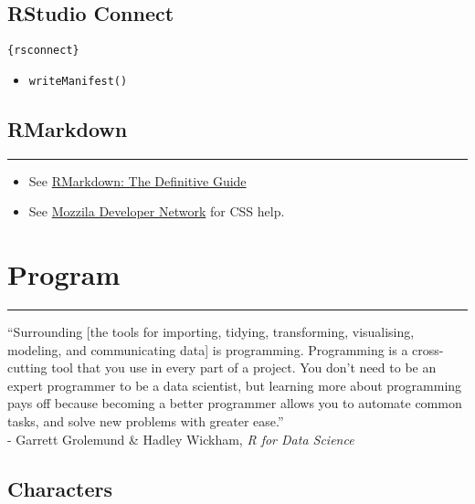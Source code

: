 \documentclass[
]{book}
\providecommand{\tightlist}{%
  \setlength{\itemsep}{0pt}\setlength{\parskip}{0pt}}
\begin{document}
\hypertarget{rstudio-connect}{%
\section{RStudio Connect}\label{rstudio-connect}}

\texttt{\{rsconnect\}}

\begin{itemize}
\tightlist
\item
  \texttt{writeManifest()}
\end{itemize}

\hypertarget{rmarkdown}{%
\section{RMarkdown}\label{rmarkdown}}

\begin{center}\rule{0.5\linewidth}{0.5pt}\end{center}

\begin{itemize}
\tightlist
\item
  See \href{https://bookdown.org/yihui/rmarkdown/}{RMarkdown: The Definitive Guide}
\item
  See \href{https://developer.mozilla.org/en-US/docs/Web/CSS/CSS_Selectors}{Mozzila Developer Network} for CSS help.
\end{itemize}

\hypertarget{program}{%
\chapter{Program}\label{program}}

\begin{center}\rule{0.5\linewidth}{0.5pt}\end{center}

``Surrounding {[}the tools for importing, tidying, transforming, visualising, modeling, and communicating data{]} is programming. Programming is a cross-cutting tool that you use in every part of a project. You don't need to be an expert programmer to be a data scientist, but learning more about programming pays off because becoming a better programmer allows you to automate common tasks, and solve new problems with greater ease.''\\
- Garrett Grolemund \& Hadley Wickham, \emph{R for Data Science}

\hypertarget{characters}{%
\section{Characters}\label{characters}}
\end{document}
